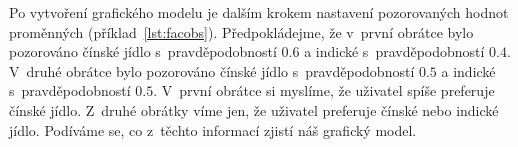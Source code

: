 %
%
%
%
%
%

Po vytvoření grafického modelu je dalším krokem nastavení pozorovaných hodnot proměnných (příklad~\ref{lst:facobs}).
Předpokládejme, že v~první obrátce bylo pozorováno čínské jídlo s~pravděpodobností $0.6$ a indické s~pravděpodobností $0.4$.
V~druhé obrátce bylo pozorováno čínské jídlo s~pravděpodobností $0.5$ a indické s~pravděpodobností $0.5$.
V~první obrátce si myslíme, že uživatel spíše preferuje čínské jídlo.
Z~druhé obrátky víme jen, že uživatel preferuje čínské nebo indické jídlo. 
Podíváme se, co z~těchto informací zjistí náš grafický model.

